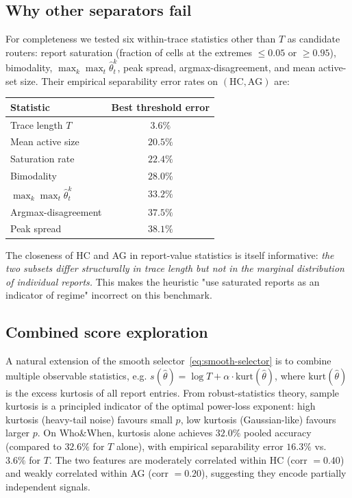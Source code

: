 \documentclass[11pt]{article}
\newcommand{\thetahat}{\hat{\theta}}
\begin{document}
\subsection{Why other separators fail}
\label{sec:why-T}

For completeness we tested six within-trace statistics other than $T$ as
candidate routers: report saturation (fraction of cells at the extremes
$\leq 0.05$ or $\geq 0.95$), bimodality, $\max_k \max_t \thetahat^k_t$,
peak spread, argmax-disagreement, and mean active-set size. Their
empirical separability error rates on $(\text{HC}, \text{AG})$ are:

\begin{center}
\small
\begin{tabular}{lc}
\toprule
Statistic & Best threshold error \\
\midrule
Trace length $T$       & $\mathbf{3.6\%}$ \\
Mean active size       & $20.5\%$ \\
Saturation rate        & $22.4\%$ \\
Bimodality             & $28.0\%$ \\
$\max_k \max_t \thetahat^k_t$ & $33.2\%$ \\
Argmax-disagreement    & $37.5\%$ \\
Peak spread            & $38.1\%$ \\
\bottomrule
\end{tabular}
\end{center}
The closeness of HC and AG in report-value statistics is itself
informative: \emph{the two subsets differ structurally in trace length
but not in the marginal distribution of individual reports.} This makes
the heuristic "use saturated reports as an indicator of regime"
incorrect on this benchmark.

\subsection{Combined score exploration}
\label{sec:combined}

A natural extension of the smooth selector~\eqref{eq:smooth-selector} is to
combine multiple observable statistics, e.g.
$s(\thetahat) = \log T + \alpha \cdot \mathrm{kurt}(\thetahat)$, where
$\mathrm{kurt}(\thetahat)$ is the excess kurtosis of all report entries.
From robust-statistics theory, sample kurtosis is a principled indicator
of the optimal power-loss exponent: high kurtosis (heavy-tail noise)
favours small $p$, low kurtosis (Gaussian-like) favours larger $p$. On
Who\&When, kurtosis alone achieves $32.0\%$ pooled accuracy (compared to
$32.6\%$ for $T$ alone), with empirical separability error $16.3\%$ vs.\
$3.6\%$ for $T$. The two features are moderately correlated within HC
(corr $= 0.40$) and weakly correlated within AG (corr $= 0.20$),
suggesting they encode partially independent signals.
\end{document}

